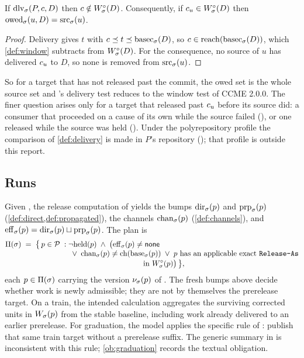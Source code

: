 \begin{lemma}
\label{lem:deliv-window}
If $\mathrm{dlv}_{\sigma}(P,c,D)$ then $c \notin W^{\circ}_{\sigma}(D)$. Consequently, if
$c_{u} \in W^{\circ}_{\sigma}(D)$ then $\mathrm{owed}_{\sigma}(u,D) = \mathrm{src}_{\sigma}(u)$.
\end{lemma}

\begin{proof}
Delivery gives $t$ with $c \preceq t \preceq \mathrm{basec}_{\sigma}(D)$, so $c \in
\mathrm{reach}(\mathrm{basec}_{\sigma}(D))$, which \cref{def:window} subtracts from $W^{\circ}_{\sigma}(D)$.
For the consequence, no source of $u$ has delivered $c_{u}$ to $D$, so none is
removed from $\mathrm{src}_{\sigma}(u)$.
\end{proof}

So for a target that has not released past the commit, the owed set is the
whole source set and 's delivery test reduces to the window test of
CCME 2.0.0. The finer question arises only for a target that released past
$c_{u}$ before its source did: a consumer that proceeded on a cause of its own
while the source failed (), or one released while the source was
held (). Under the polyrepository profile the comparison of
\cref{def:delivery} is made in $P$'s repository (); that profile is
outside this report.

\subsection{Runs}

\begin{definition}[plan]
\label{def:plan}
Given \st{}, the release computation of  yields the bumps
$\mathrm{dir}_{\sigma}(p)$ and $\mathrm{prp}_{\sigma}(p)$ (\cref{def:direct,def:propagated}), the
channels $\mathrm{chan}_{\sigma}(p)$ (\cref{def:channels}), and
$\mathrm{eff}_{\sigma}(p) = \mathrm{dir}_{\sigma}(p) \sqcup \mathrm{prp}_{\sigma}(p)$. The plan is
\begin{align*}
  \plan{\st} \;=\; \bigl\{\, p \in \Pkgs \;:\;
    &\lnot\held{p} \;\land\;
    \bigl(\effb{\st}{p} \neq \bnone \\[-1mm]
    &\;\lor\; \chanres{\st}{p} \neq \chanof{\base{\st}{p}}
    \;\lor\; p \text{ has an applicable exact } \code{Release-As} \\[-1mm]
    &\hspace{35mm}\text{in }\Winf{\st}{p} \bigr) \,\bigr\},
\end{align*}
each $p \in \Pi(\sigma)$ carrying the version $\nu_{\sigma}(p)$ of . The fresh bumps above decide whether work is newly admissible; they are not by themselves the prerelease target. On a train, the intended calculation aggregates the surviving corrected units in $W_{\sigma}(p)$ from the stable baseline, including work already delivered to an earlier prerelease. For graduation, the model applies the specific rule of : publish that same train target without a prerelease suffix. The generic summary in  is inconsistent with this rule; \cref{ob:graduation} records the textual obligation.
\end{definition}

